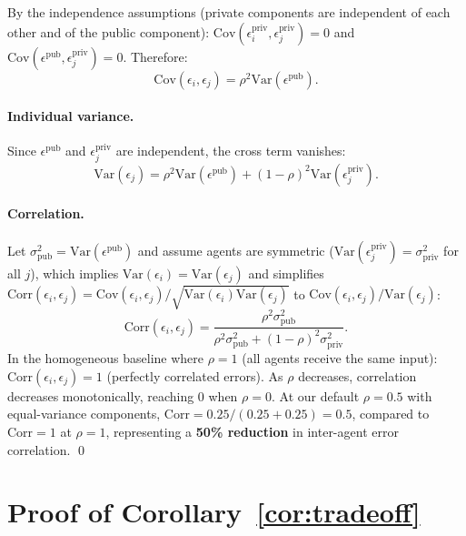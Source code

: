 \documentclass[11pt]{article}
\theoremstyle{plain}
\theoremstyle{definition}
\begin{document}
  
By the independence assumptions (private components are independent of each other and
of the public component): $\mathrm{Cov}(\epsilon_i^{\mathrm{priv}}, \epsilon_j^{\mathrm{priv}}) = 0$
and $\mathrm{Cov}(\epsilon^{\mathrm{pub}}, \epsilon_j^{\mathrm{priv}}) = 0$.
Therefore:
\begin{equation}
\mathrm{Cov}(\epsilon_i, \epsilon_j) = \rho^2 \mathrm{Var}(\epsilon^{\mathrm{pub}}).
\end{equation}

\paragraph{Individual variance.}
Since $\epsilon^{\mathrm{pub}}$ and $\epsilon_j^{\mathrm{priv}}$ are independent, the cross term vanishes:
\begin{equation}
\mathrm{Var}(\epsilon_j) = \rho^2 \mathrm{Var}(\epsilon^{\mathrm{pub}})
  + (1{-}\rho)^2 \mathrm{Var}(\epsilon_j^{\mathrm{priv}}).
\end{equation}

\paragraph{Correlation.}
  Let $\sigma_{\mathrm{pub}}^2 = \mathrm{Var}(\epsilon^{\mathrm{pub}})$ and assume agents
  are symmetric ($\mathrm{Var}(\epsilon_j^{\mathrm{priv}}) = \sigma_{\mathrm{priv}}^2$ for all $j$),
  which implies $\mathrm{Var}(\epsilon_i) = \mathrm{Var}(\epsilon_j)$ and simplifies
  $\mathrm{Corr}(\epsilon_i, \epsilon_j) = \mathrm{Cov}(\epsilon_i, \epsilon_j) /
  \sqrt{\mathrm{Var}(\epsilon_i)\mathrm{Var}(\epsilon_j)}$
  to $\mathrm{Cov}(\epsilon_i, \epsilon_j) / \mathrm{Var}(\epsilon_j)$:
\begin{equation}
\mathrm{Corr}(\epsilon_i, \epsilon_j)
  = \frac{\rho^2 \sigma_{\mathrm{pub}}^2}{\rho^2 \sigma_{\mathrm{pub}}^2 + (1{-}\rho)^2 \sigma_{\mathrm{priv}}^2}.
\end{equation}
 In the homogeneous baseline where $\rho = 1$ (all agents receive the same input):
  $\mathrm{Corr}(\epsilon_i, \epsilon_j) = 1$ (perfectly correlated errors).
  As $\rho$ decreases, correlation decreases monotonically, reaching 0 when $\rho = 0$.
  At our default $\rho = 0.5$ with equal-variance components,
  $\mathrm{Corr} = 0.25 / (0.25 + 0.25) = 0.5$, compared to $\mathrm{Corr} = 1$
  at $\rho = 1$, representing a \textbf{50\% reduction} in inter-agent error correlation. \qed

\section{Proof of Corollary~\ref{cor:tradeoff}}
  \label{sec:appendix_corollary}
\end{document}
